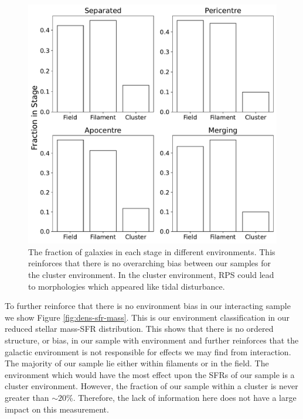 \begin{figure}
\centering
\includegraphics[width=\textwidth]{Chapter3/figures/environment-fractions.pdf}
\caption[The fraction of galaxies in each stage in different environments.]{The fraction of galaxies in each stage in different environments. This reinforces that there is no overarching bias between our samples for the cluster environment. In the cluster environment, RPS could lead to morphologies which appeared like tidal disturbance.}
\label{fig:environ-fract}
\end{figure}

To further reinforce that there is no environment bias in our interacting sample we show Figure \ref{fig:dens-sfr-mass}. This is our environment classification in our reduced stellar mass-SFR distribution. This shows that there is no ordered structure, or bias, in our sample with environment and further reinforces that the galactic environment is not responsible for effects we may find from interaction. The majority of our sample lie either within filaments or in the field. The environment which would have the most effect upon the SFRs of our sample is a cluster environment. However, the fraction of our sample within a cluster is never greater than $\sim20$\%. Therefore, the lack of information here does not have a large impact on this measurement. 

